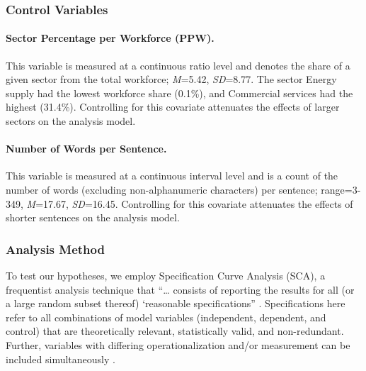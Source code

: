 \documentclass[man]{apa7}
\begin{document}
\subsubsection{Control Variables}
\label{controls}
\paragraph{Sector Percentage per Workforce (PPW).}
\label{ppw}
This variable is measured at a continuous ratio level and denotes the share of a given sector from the total workforce; \textit{M}=5.42, \textit{SD}=8.77. The sector Energy supply had the lowest workforce share (0.1\%), and Commercial services had the highest (31.4\%). Controlling for this covariate attenuates the effects of larger sectors on the analysis model.

\paragraph{Number of Words per Sentence.}
\label{num_words}
This variable is measured at a continuous interval level and is a count of the number of words (excluding non-alphanumeric characters) per sentence; range=3-349, \textit{M}=17.67, \textit{SD}=16.45. Controlling for this covariate attenuates the effects of shorter sentences on the analysis model.

\subsubsection{Analysis Method}
\label{analysis}
To test our hypotheses, we employ Specification Curve Analysis (SCA), a frequentist analysis technique that “… consists of reporting the results for all (or a large random subset thereof) ‘reasonable specifications” \parencite[1208]{simonsohn_specification_2020}. Specifications here refer to all combinations of model variables (independent, dependent, and control) that are theoretically relevant, statistically valid, and non-redundant. Further, variables with differing operationalization and/or measurement can be included simultaneously \parencite[see][]{frey_identifying_2020}.
\end{document}
